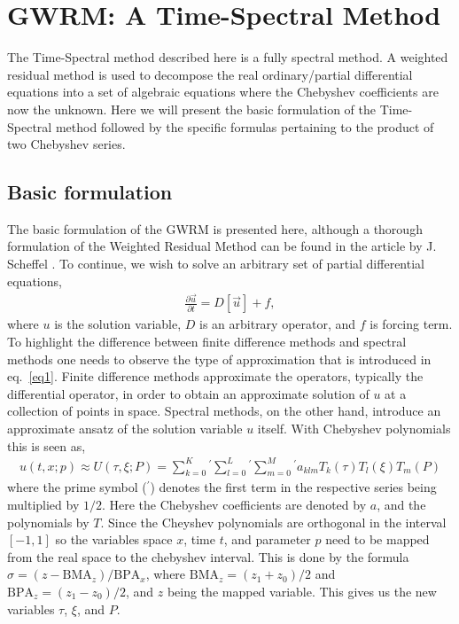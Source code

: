 \documentclass{article}
\begin{document}
\section{GWRM: A Time-Spectral Method}
The Time-Spectral method described here is a fully spectral method. A weighted residual method is used to decompose the real ordinary/partial differential equations into a set of algebraic equations where the Chebyshev coefficients are now the unknown. Here we will present the basic formulation of the Time-Spectral method followed by the specific formulas pertaining to the product of two Chebyshev series. 

\subsection{Basic formulation}
The basic formulation of the GWRM is presented here, although a thorough formulation of the Weighted Residual Method can be found in the article by J. Scheffel \cite{scheffel2012}. To continue, we wish to solve an arbitrary set of partial differential equations,
\begin{align}
\frac{\partial \vec{u}}{\partial t} = D[\vec{u}] + f,
\label{eq1}
\end{align}
where $u$ is the solution variable, $D$ is an arbitrary operator, and $f$ is forcing term. To highlight the difference between finite difference methods and spectral methods one needs to observe the type of approximation that is introduced in eq.~\ref{eq1}. Finite difference methods approximate the operators, typically the differential operator, in order to obtain an approximate solution of $u$ at a collection of points in space. Spectral methods, on the other hand, introduce an approximate ansatz of the solution variable $u$ itself. With Chebyshev polynomials this is seen as,
\begin{align}
u(t,x;p) \approx U(\tau,\xi;P) = \sum_{k=0}^{K}{}^{\prime}\sum_{l=0}^{L}{}^{\prime}\sum_{m=0}^{M}{}^{\prime} a_{klm}T_k(\tau)T_l(\xi)T_m(P)
\label{eq2}
\end{align}
where the prime symbol (${}^{\prime}$) denotes the first term in the respective series being multiplied by $1/2$. Here the Chebyshev coefficients are denoted by $a$, and the polynomials by $T$. Since the Cheyshev polynomials are orthogonal in the interval $[-1,1]$ so the variables space $x$, time $t$, and parameter $p$ need to be mapped from the real space to the chebyshev interval. This is done by the formula $\sigma=(z-\text{BMA}_z)/\text{BPA}_x$, where $\text{BMA}_z=(z_1+z_0)/2$ and $\text{BPA}_z=(z_1-z_0)/2$, and $z$ being the mapped variable. This gives us the new variables $\tau$, $\xi$, and $P$.
\end{document}
